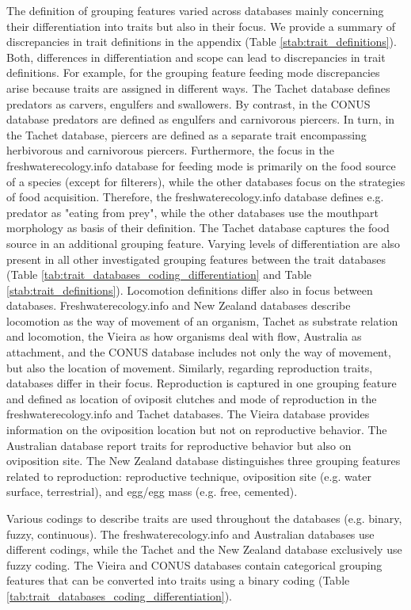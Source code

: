 \documentclass{article}
\begin{document}
The definition of grouping features varied across databases mainly concerning their differentiation into traits but also in their focus. We provide a summary of discrepancies in trait definitions in the appendix (Table \ref{stab:trait_definitions}). Both, differences in differentiation and scope can lead to discrepancies in trait definitions. For example, for the grouping feature feeding mode discrepancies arise because traits are assigned in different ways. The Tachet database defines predators as carvers, engulfers and swallowers. By contrast, in the CONUS database predators are defined as engulfers and carnivorous piercers. In turn, in the Tachet database, piercers are defined as a separate trait encompassing herbivorous and carnivorous piercers. Furthermore, the focus in the freshwaterecology.info database for feeding mode is primarily on the food source of a species (except for filterers), while the other databases focus on the strategies of food acquisition. Therefore, the freshwaterecology.info database defines e.g. predator as "eating from prey", while the other databases use the mouthpart morphology as basis of their definition. The Tachet database captures the food source in an additional grouping feature. Varying levels of differentiation are also present in all other investigated grouping features between the trait databases (Table \ref{tab:trait_databases_coding_differentiation} and Table \ref{stab:trait_definitions}). Locomotion definitions differ also in focus between databases. Freshwaterecology.info and New Zealand databases describe locomotion as the way of movement of an organism, Tachet as substrate relation and locomotion, the Vieira as how organisms deal with flow, Australia as attachment, and the CONUS database includes not only the way of movement, but also the location of movement. Similarly, regarding reproduction traits, databases differ in their focus. Reproduction is captured in one grouping feature and defined as location of oviposit clutches and mode of reproduction in the freshwaterecology.info and Tachet databases. The Vieira database provides information on the oviposition location but not on reproductive behavior. The Australian database report traits for reproductive behavior but also on oviposition site. The New Zealand database distinguishes three grouping features related to reproduction: reproductive technique, oviposition site (e.g. water surface, terrestrial), and egg/egg mass (e.g. free, cemented).

Various codings to describe traits are used throughout the databases (e.g. binary, fuzzy, continuous). The freshwaterecology.info and Australian databases use different codings, while the Tachet and the New Zealand database exclusively use fuzzy coding. The Vieira and CONUS databases contain categorical grouping features that can be converted into traits using a binary coding (Table \ref{tab:trait_databases_coding_differentiation}). 
\end{document}
